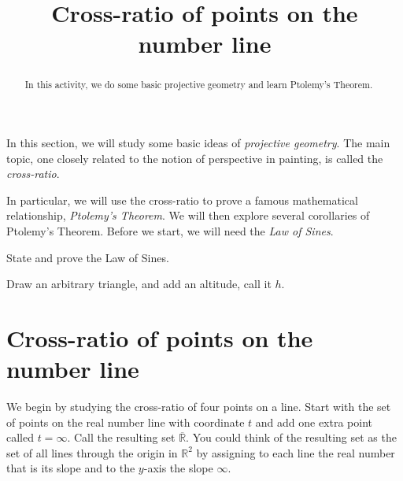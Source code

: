 \documentclass{ximera}
\title{Cross-ratio of points on the number line}
\begin{document}
\begin{abstract}
In this activity, we do some basic projective geometry and learn
Ptolemy's Theorem.
\end{abstract}
\maketitle

In this section, we will study some basic ideas of \textit{projective
  geometry}. The main topic, one closely related to the notion of
perspective in painting, is called the \textit{cross-ratio}.

In particular, we will use the cross-ratio to prove a famous
mathematical relationship, \textit{Ptolemy's Theorem}. We will then
explore several corollaries of Ptolemy's Theorem. Before we start, we
will need the \textit{Law of Sines}.

\begin{problem}
State and prove the Law of Sines. 
\begin{hint}
Draw an arbitrary triangle, and add an altitude, call it $h$. 
\end{hint}
\begin{freeResponse}
\end{freeResponse}
\end{problem}



\section*{Cross-ratio of points on the number line}

We begin by studying the cross-ratio of four points on a line. Start
with the set of points on the real number line with coordinate $t$ and
add one extra point called $t=\infty$. Call the resulting set
$\overline{\mathbb{R}}$. You could think of the resulting set as the
set of all lines through the origin in $\mathbb{R}^{2}$ by assigning
to each line the real number that is its slope and to the $y$-axis the
slope $\infty$.
\end{document}
